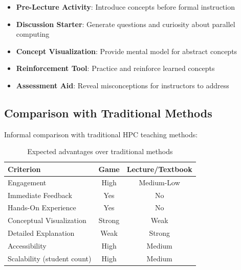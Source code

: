 \begin{itemize}
    \item \textbf{Pre-Lecture Activity}: Introduce concepts before formal instruction
    \item \textbf{Discussion Starter}: Generate questions and curiosity about parallel computing
    \item \textbf{Concept Visualization}: Provide mental model for abstract concepts
    \item \textbf{Reinforcement Tool}: Practice and reinforce learned concepts
    \item \textbf{Assessment Aid}: Reveal misconceptions for instructors to address
\end{itemize}

\subsection{Comparison with Traditional Methods}
\label{subsec:comparison-traditional}

Informal comparison with traditional HPC teaching methods:

\begin{table}[htbp]
    \centering
    \caption{Expected advantages over traditional methods}
    \label{tab:comparison-traditional}
    \begin{tabular}{@{}lcc@{}}
        \toprule
        \textbf{Criterion}          & \textbf{Game} & \textbf{Lecture/Textbook} \\
        \midrule
        Engagement                  & High          & Medium-Low                \\
        Immediate Feedback          & Yes           & No                        \\
        Hands-On Experience         & Yes           & No                        \\
        Conceptual Visualization    & Strong        & Weak                      \\
        Detailed Explanation        & Weak          & Strong                    \\
        Accessibility               & High          & Medium                    \\
        Scalability (student count) & High          & Medium                    \\
        \bottomrule
    \end{tabular}
\end{table}

